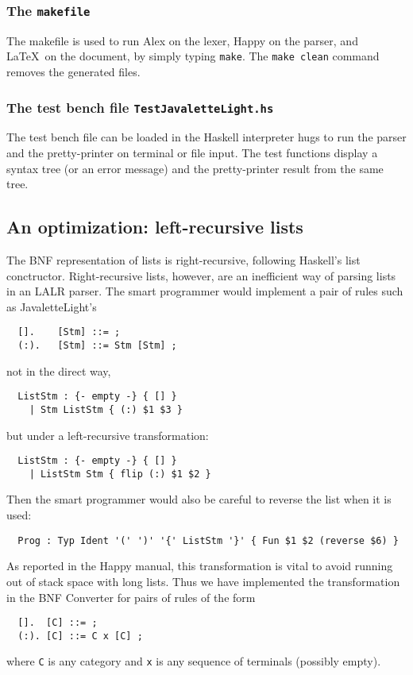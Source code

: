 \documentclass[10pt]{article}
\begin{document}
\subsubsection{The {\tt makefile}}

The makefile is used to run Alex on the lexer, Happy on the parser, and
\LaTeX\ on the document, by simply typing {\tt make}. The {\tt make clean}
command removes the generated files.



\subsubsection{The test bench file {\tt TestJavaletteLight.hs}}

The test bench file can be loaded in the Haskell interpreter hugs to
run the parser and the pretty-printer on terminal or file input.
The test functions display a syntax tree (or an error message)
and the pretty-printer result from the same tree.


\subsection{An optimization: left-recursive lists}

\label{leftrec}

The BNF representation of lists is right-recursive, following Haskell's
list conctructor. Right-recursive lists, however, are an inefficient way of parsing
lists in an LALR parser. The smart programmer would implement a pair of rules
such as JavaletteLight's
\begin{verbatim}
  [].    [Stm] ::= ;
  (:).   [Stm] ::= Stm [Stm] ;
\end{verbatim}
not in the direct way,
\begin{verbatim}
  ListStm : {- empty -} { [] }
    | Stm ListStm { (:) $1 $3 }
\end{verbatim}
but under a left-recursive transformation:
\begin{verbatim}
  ListStm : {- empty -} { [] }
    | ListStm Stm { flip (:) $1 $2 }
\end{verbatim}
Then the smart programmer would also be careful to reverse the list
when it is used:
\begin{verbatim}
  Prog : Typ Ident '(' ')' '{' ListStm '}' { Fun $1 $2 (reverse $6) }
\end{verbatim}%
As reported in the Happy manual, this transformation is vital
to avoid running out of stack space with long lists.
Thus we have implemented the transformation in the BNF Converter for
pairs of rules of the form
\begin{verbatim}
  [].  [C] ::= ;
  (:). [C] ::= C x [C] ;
\end{verbatim}
where {\tt C} is any category and {\tt x} is any sequence of
terminals (possibly empty).
\end{document}
